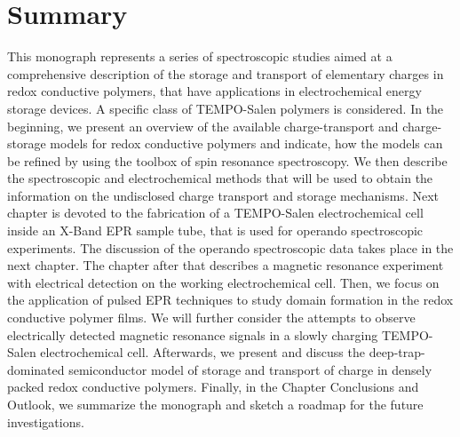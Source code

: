 \chapter*{Summary}

This monograph represents a series of spectroscopic studies aimed at a comprehensive description of the storage and transport of elementary charges in redox conductive polymers, that have applications in electrochemical energy storage devices. A specific class of TEMPO-Salen polymers is considered. In the beginning, we present an overview of the available charge-transport and charge-storage models for redox conductive polymers and indicate, how the models can be refined by using the toolbox of spin resonance spectroscopy. We then describe the spectroscopic and electrochemical methods that will be used to obtain the information on the undisclosed charge transport and storage mechanisms. Next chapter is devoted to the fabrication of a TEMPO-Salen electrochemical cell inside an X-Band EPR sample tube, that is used for operando spectroscopic experiments. The discussion of the operando spectroscopic data takes place in the next chapter. The chapter after that describes a magnetic resonance experiment with electrical detection on the working electrochemical cell. Then, we focus on the application of pulsed EPR techniques to study domain formation in the redox conductive polymer films. We will further consider the attempts to observe electrically detected magnetic resonance signals in a slowly charging TEMPO-Salen electrochemical cell. Afterwards, we present and discuss the deep-trap-dominated semiconductor model of storage and transport of charge in densely packed redox conductive polymers. Finally, in the Chapter Conclusions and Outlook, we summarize the monograph and sketch a roadmap for the future investigations.

